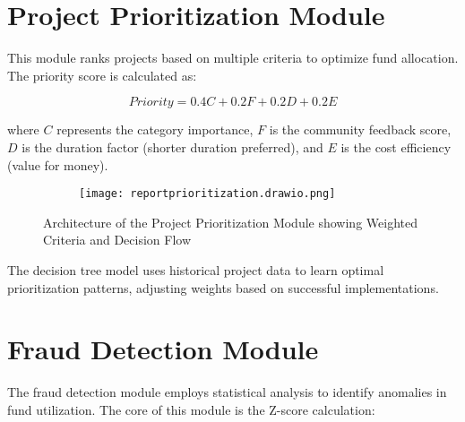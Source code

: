 \documentclass[12pt,a4paper]{report}
\begin{document}
\section{Project Prioritization Module}
\indent \indent This module ranks projects based on multiple criteria to optimize fund allocation. The priority score is calculated as:

\begin{equation}
Priority = 0.4C + 0.2F + 0.2D + 0.2E
\end{equation}

\noindent where $C$ represents the category importance, $F$ is the community feedback score, $D$ is the duration factor (shorter duration preferred), and $E$ is the cost efficiency (value for money).

\begin{figure}[H]
    \centering
    \begin{figure}
        \centering
        \texttt{[image: reportprioritization.drawio.png]}
        \label{fig:enter-label}
    \end{figure}
    \caption{Architecture of the Project Prioritization Module showing Weighted Criteria and Decision Flow}
    \label{fig:prioritization_architecture}
\end{figure}

\noindent The decision tree model uses historical project data to learn optimal prioritization patterns, adjusting weights based on successful implementations.

\section{Fraud Detection Module}
\indent \indent The fraud detection module employs statistical analysis to identify anomalies in fund utilization. The core of this module is the Z-score calculation:
\end{document}
